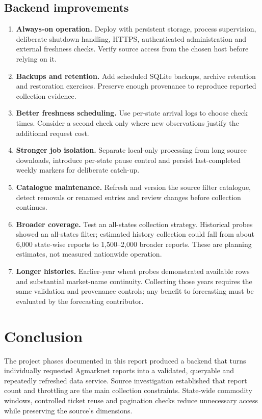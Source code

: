 \documentclass[12pt,a4paper,oneside]{report}
\numberwithin{equation}{chapter}
\numberwithin{figure}{chapter}
\numberwithin{table}{chapter}
\theoremstyle{definition}
\begin{document}
\section{Backend improvements}
\begin{enumerate}
  \item \textbf{Always-on operation.} Deploy with persistent storage, process supervision, deliberate shutdown handling, HTTPS, authenticated administration and external freshness checks. Verify source access from the chosen host before relying on it.
  \item \textbf{Backups and retention.} Add scheduled SQLite backups, archive retention and restoration exercises. Preserve enough provenance to reproduce reported collection evidence.
  \item \textbf{Better freshness scheduling.} Use per-state arrival logs to choose check times. Consider a second check only where new observations justify the additional request cost.
  \item \textbf{Stronger job isolation.} Separate local-only processing from long source downloads, introduce per-state pause control and persist last-completed weekly markers for deliberate catch-up.
  \item \textbf{Catalogue maintenance.} Refresh and version the source filter catalogue, detect removals or renamed entries and review changes before collection continues.
  \item \textbf{Broader coverage.} Test an all-states collection strategy. Historical probes showed an all-states filter; estimated history collection could fall from about 6,000 state-wise reports to 1,500--2,000 broader reports. These are planning estimates, not measured nationwide operation.
  \item \textbf{Longer histories.} Earlier-year wheat probes demonstrated available rows and substantial market-name continuity. Collecting those years requires the same validation and provenance controls; any benefit to forecasting must be evaluated by the forecasting contributor.
\end{enumerate}

\chapter{Conclusion}
The project phases documented in this report produced a backend that turns individually requested Agmarknet reports into a validated, queryable and repeatedly refreshed data service. Source investigation established that report count and throttling are the main collection constraints. State-wide commodity windows, controlled ticket reuse and pagination checks reduce unnecessary access while preserving the source's dimensions.
\end{document}
